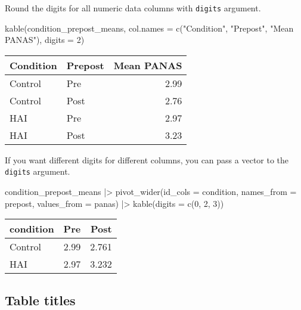 \documentclass[
  doc]{apa6}
\newenvironment{Shaded}{\begin{snugshade}}{\end{snugshade}}
\newcommand{\AttributeTok}[1]{\textcolor[rgb]{0.77,0.63,0.00}{#1}}
\newcommand{\DecValTok}[1]{\textcolor[rgb]{0.00,0.00,0.81}{#1}}
\newcommand{\FunctionTok}[1]{\textcolor[rgb]{0.00,0.00,0.00}{#1}}
\newcommand{\NormalTok}[1]{#1}
\newcommand{\SpecialCharTok}[1]{\textcolor[rgb]{0.00,0.00,0.00}{#1}}
\newcommand{\StringTok}[1]{\textcolor[rgb]{0.31,0.60,0.02}{#1}}
\begin{document}
Round the digits for all numeric data columns with \texttt{digits} argument.

\begin{Shaded}
\begin{Highlighting}[]
\FunctionTok{kable}\NormalTok{(condition\_prepost\_means,}
      \AttributeTok{col.names =} \FunctionTok{c}\NormalTok{(}\StringTok{"Condition"}\NormalTok{, }\StringTok{"Prepost"}\NormalTok{, }\StringTok{"Mean PANAS"}\NormalTok{), }
      \AttributeTok{digits =} \DecValTok{2}\NormalTok{)}
\end{Highlighting}
\end{Shaded}

\begin{tabular}{l|l|r}
\hline
Condition & Prepost & Mean PANAS\\
\hline
Control & Pre & 2.99\\
\hline
Control & Post & 2.76\\
\hline
HAI & Pre & 2.97\\
\hline
HAI & Post & 3.23\\
\hline
\end{tabular}

If you want different digits for different columns, you can pass a vector to the \texttt{digits} argument.

\begin{Shaded}
\begin{Highlighting}[]
\NormalTok{condition\_prepost\_means }\SpecialCharTok{|\textgreater{}} 
  \FunctionTok{pivot\_wider}\NormalTok{(}\AttributeTok{id\_cols =}\NormalTok{ condition, }\AttributeTok{names\_from =}\NormalTok{ prepost, }\AttributeTok{values\_from =}\NormalTok{ panas) }\SpecialCharTok{|\textgreater{}} 
  \FunctionTok{kable}\NormalTok{(}\AttributeTok{digits =} \FunctionTok{c}\NormalTok{(}\DecValTok{0}\NormalTok{, }\DecValTok{2}\NormalTok{, }\DecValTok{3}\NormalTok{))}
\end{Highlighting}
\end{Shaded}

\begin{tabular}{l|r|r}
\hline
condition & Pre & Post\\
\hline
Control & 2.99 & 2.761\\
\hline
HAI & 2.97 & 3.232\\
\hline
\end{tabular}

\newpage

\hypertarget{table-titles}{%
\subsection{Table titles}\label{table-titles}}
\end{document}
